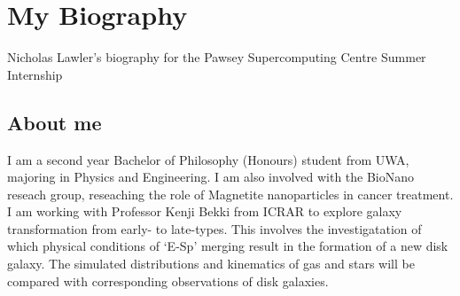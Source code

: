 \section{My Biography}
Nicholas Lawler's biography for the Pawsey Supercomputing Centre Summer Internship
\subsection{About me}
I am a second year Bachelor of Philosophy (Honours) student from UWA, majoring in Physics and Engineering. I am also involved with the BioNano reseach group, reseaching the role of Magnetite nanoparticles in cancer treatment. 
I am working with Professor Kenji Bekki from ICRAR to explore galaxy transformation from early- to late-types. This involves the investigatation of which physical conditions of `E-Sp’ merging result in the formation of a new disk galaxy. The simulated distributions and kinematics of gas and stars will be compared with corresponding observations of disk galaxies.
